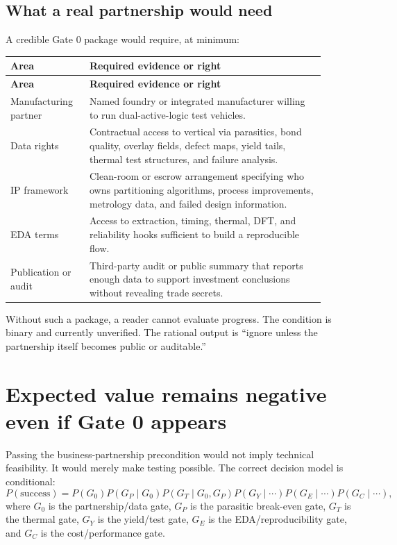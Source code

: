 \documentclass[11pt]{article}
\begin{document}
\subsection{What a real partnership would need}
A credible Gate 0 package would require, at minimum:
\begin{longtable}{p{0.22\linewidth}p{0.68\linewidth}}
\toprule
\textbf{Area} & \textbf{Required evidence or right}\\
\midrule
\endfirsthead
\toprule
\textbf{Area} & \textbf{Required evidence or right}\\
\midrule
\endhead
Manufacturing partner & Named foundry or integrated manufacturer willing to run dual-active-logic test vehicles.\\
Data rights & Contractual access to vertical via parasitics, bond quality, overlay fields, defect maps, yield tails, thermal test structures, and failure analysis.\\
IP framework & Clean-room or escrow arrangement specifying who owns partitioning algorithms, process improvements, metrology data, and failed design information.\\
EDA terms & Access to extraction, timing, thermal, DFT, and reliability hooks sufficient to build a reproducible flow.\\
Publication or audit & Third-party audit or public summary that reports enough data to support investment conclusions without revealing trade secrets.\\
\bottomrule
\end{longtable}

Without such a package, a reader cannot evaluate progress. The condition is binary and currently unverified. The rational output is ``ignore unless the partnership itself becomes public or auditable.''

\section{Expected value remains negative even if Gate 0 appears}
Passing the business-partnership precondition would not imply technical feasibility. It would merely make testing possible. The correct decision model is conditional:
\begin{equation}
P(\mathrm{success}) = P(G_0)P(G_P\mid G_0)P(G_T\mid G_0,G_P)P(G_Y\mid \cdots)P(G_E\mid \cdots)P(G_C\mid \cdots),
\end{equation}
where $G_0$ is the partnership/data gate, $G_P$ is the parasitic break-even gate, $G_T$ is the thermal gate, $G_Y$ is the yield/test gate, $G_E$ is the EDA/reproducibility gate, and $G_C$ is the cost/performance gate.
\end{document}
